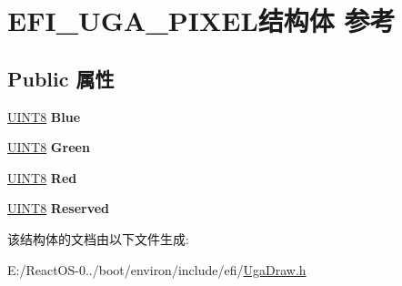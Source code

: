 \hypertarget{struct_e_f_i___u_g_a___p_i_x_e_l}{}\section{E\+F\+I\+\_\+\+U\+G\+A\+\_\+\+P\+I\+X\+E\+L结构体 参考}
\label{struct_e_f_i___u_g_a___p_i_x_e_l}
\subsection*{Public 属性}
\begin{DoxyCompactItemize}
\item 
\mbox{\label{struct_e_f_i___u_g_a___p_i_x_e_l_a37f30ea38a46ff8f5fded79c9fc146d0}} 
\hyperlink{_processor_bind_8h_ab27e9918b538ce9d8ca692479b375b6a}{U\+I\+N\+T8} {\bfseries Blue}
\item 
\mbox{\label{struct_e_f_i___u_g_a___p_i_x_e_l_ac95ef2756dde08384c914cf09fd5abcf}} 
\hyperlink{_processor_bind_8h_ab27e9918b538ce9d8ca692479b375b6a}{U\+I\+N\+T8} {\bfseries Green}
\item 
\mbox{\label{struct_e_f_i___u_g_a___p_i_x_e_l_acab6f4540351811fa68c6e3133186718}} 
\hyperlink{_processor_bind_8h_ab27e9918b538ce9d8ca692479b375b6a}{U\+I\+N\+T8} {\bfseries Red}
\item 
\mbox{\label{struct_e_f_i___u_g_a___p_i_x_e_l_a22aff25b4a01faef12b1da5a5b213c51}} 
\hyperlink{_processor_bind_8h_ab27e9918b538ce9d8ca692479b375b6a}{U\+I\+N\+T8} {\bfseries Reserved}
\end{DoxyCompactItemize}


该结构体的文档由以下文件生成\+:\begin{DoxyCompactItemize}
\item 
E\+:/\+React\+O\+S-\/0../boot/environ/include/efi/\hyperlink{_uga_draw_8h}{Uga\+Draw.\+h}\end{DoxyCompactItemize}
